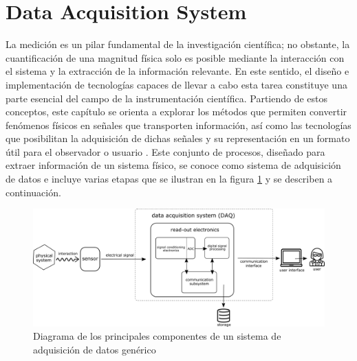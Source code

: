 \documentclass[]{book}
\begin{document}
\chapter*{Data Acquisition System }

\noindent La medición es un pilar fundamental de la investigación científica; no obstante, la cuantificación de una magnitud física solo es posible mediante la interacción con el sistema y la extracción de la información relevante. En este sentido, el diseño e implementación de tecnologías capaces de llevar a cabo esta tarea constituye una parte esencial del campo de la instrumentación científica. Partiendo de estos conceptos, este capítulo se orienta a explorar los métodos que permiten convertir fenómenos físicos en señales que transporten información, así como las tecnologías que posibilitan la adquisición de dichas señales y su representación en un formato útil para el observador o usuario \cite{webster2018measurement}. Este conjunto de procesos, diseñado para extraer información de un sistema físico, se conoce como sistema de adquisición de datos e incluye varias etapas que se ilustran en la figura \ref{fig:DAQ_generic} y se describen a continuación.\\

\begin{figure}[h]
    \centering
    \includegraphics[width=1.0\textwidth]{DAQ_chain.png}
    \caption{Diagrama de los principales componentes de un sistema de adquisición de datos genérico}
    \label{fig:DAQ_generic}

\end{figure}
\end{document}
